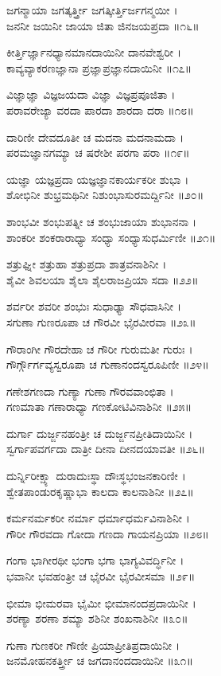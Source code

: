 ಜಗನ್ಮಾಯಾ ಜಗತ್ಕರ್ತ್ತ್ರೀ ಜಗತ್ಕೀರ್ತ್ತಿರ್ಜಗನ್ಮಯೀ ।\\
ಜನನೀ ಜಯಿನೀ ಜಾಯಾ ಜಿತಾ ಜಿನಜಯಪ್ರದಾ ॥೧೬॥

ಕೀರ್ತ್ತಿರ್ಜ್ಞಾನಧ್ಯಾನಮಾನದಾಯಿನೀ ದಾನವೇಶ್ವರೀ ।\\
ಕಾವ್ಯವ್ಯಾಕರಣಜ್ಞಾನಾ ಪ್ರಜ್ಞಾಪ್ರಜ್ಞಾನದಾಯಿನೀ ॥೧೭॥

ವಿಜ್ಞಾಜ್ಞಾ ವಿಜ್ಞಜಯದಾ ವಿಜ್ಞಾ ವಿಜ್ಞಪ್ರಪೂಜಿತಾ ।\\
ಪರಾವರೇಜ್ಯಾ ವರದಾ ಪಾರದಾ ಶಾರದಾ ದರಾ ॥೧೮॥

ದಾರಿಣೀ ದೇವದೂತೀ ಚ ಮದನಾ ಮದನಾಮದಾ ।\\
ಪರಮಜ್ಞಾನಗಮ್ಯಾ ಚ ಷರೇಶೀ ಪರಗಾ ಪರಾ ॥೧೯॥

ಯಜ್ಞಾ ಯಜ್ಞಪ್ರದಾ ಯಜ್ಞಜ್ಞಾನಕಾರ್ಯಕರೀ ಶುಭಾ ।\\
ಶೋಭಿನೀ ಶುಭ್ರಮಥಿನೀ ನಿಶುಂಭಾಸುರಮರ್ದ್ದಿನೀ ॥೨೦॥

ಶಾಂಭವೀ ಶಂಭುಪತ್ನೀ ಚ ಶಂಭುಜಾಯಾ ಶುಭಾನನಾ ।\\
ಶಾಂಕರೀ ಶಂಕರಾರಾಧ್ಯಾ ಸಂಧ್ಯಾ ಸಂಧ್ಯಾಸುಧರ್ಮಿಣೀ ॥೨೧॥

ಶತ್ರುಘ್ನೀ ಶತ್ರುಹಾ ಶತ್ರುಪ್ರದಾ ಶಾತ್ರವನಾಶಿನೀ ।\\
ಶೈವೀ ಶಿವಲಯಾ ಶೈಲಾ ಶೈಲರಾಜಪ್ರಿಯಾ ಸದಾ ॥೨೨॥

ಶರ್ವರೀ ಶವರೀ ಶಂಭುಃ ಸುಧಾಢ್ಯಾ ಸೌಧವಾಸಿನೀ ।\\
ಸಗುಣಾ ಗುಣರೂಪಾ ಚ ಗೌರವೀ ಭೈರವೀರವಾ ॥೨೩॥

ಗೌರಾಂಗೀ ಗೌರದೇಹಾ ಚ ಗೌರೀ ಗುರುಮತೀ ಗುರುಃ ।\\
ಗೌರ್ಗ್ಗೌರ್ಗವ್ಯಸ್ವರೂಪಾ ಚ ಗುಣಾನಂದಸ್ವರೂಪಿಣೀ ॥೨೪॥

ಗಣೇಶಗಣದಾ ಗುಣ್ಯಾ ಗುಣಾ ಗೌರವವಾಂಛಿತಾ ।\\
ಗಣಮಾತಾ ಗಣಾರಾಧ್ಯಾ ಗಣಕೋಟಿವಿನಾಶಿನೀ ॥೨೫॥

ದುರ್ಗಾ ದುರ್ಜ್ಜನಹಂತ್ರೀ ಚ ದುರ್ಜ್ಜನಪ್ರೀತಿದಾಯಿನೀ ।\\
ಸ್ವರ್ಗಾಪವರ್ಗದಾ ದಾತ್ರೀ ದೀನಾ ದೀನದಯಾವತೀ ॥೨೬॥

ದುರ್ನ್ನಿರೀಕ್ಷ್ಯಾ ದುರಾದುಃಸ್ಥಾ ದೌಃಸ್ಥಭಂಜನಕಾರಿಣೀ ।\\
ಶ್ವೇತಪಾಂಡುರಕೃಷ್ಣಾಭಾ ಕಾಲದಾ ಕಾಲನಾಶಿನೀ ॥೨೭॥

ಕರ್ಮನರ್ಮಕರೀ ನರ್ಮಾ ಧರ್ಮಾಧರ್ಮವಿನಾಶಿನೀ ।\\
ಗೌರೀ ಗೌರವದಾ ಗೋದಾ ಗಣದಾ ಗಾಯನಪ್ರಿಯಾ ॥೨೮॥

ಗಂಗಾ ಭಾಗೀರಥೀ ಭಂಗಾ ಭಗಾ ಭಾಗ್ಯವಿವರ್ದ್ಧಿನೀ ।\\
ಭವಾನೀ ಭವಹಂತ್ರೀ ಚ ಭೈರವೀ ಭೈರವೀಸಮಾ ॥೨೯॥

ಭೀಮಾ ಭೀಮರವಾ ಭೈಮೀ ಭೀಮಾನಂದಪ್ರದಾಯಿನೀ ।\\
ಶರಣ್ಯಾ ಶರಣಾ ಶಮ್ಯಾ ಶಶಿನೀ ಶಂಖನಾಶಿನೀ ॥೩೦॥

ಗುಣಾ ಗುಣಕರೀ ಗೌಣೀ ಪ್ರಿಯಾಪ್ರೀತಿಪ್ರದಾಯಿನೀ ।\\
ಜನಮೋಹನಕರ್ತ್ತ್ರೀ ಚ ಜಗದಾನಂದದಾಯಿನೀ ॥೩೧॥


